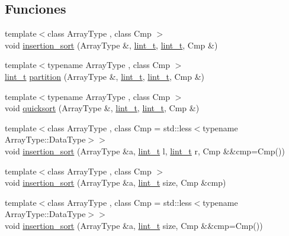 \subsection*{Funciones}
\begin{DoxyCompactItemize}
\item 
{\footnotesize template$<$class Array\+Type , class Cmp $>$ }\\void \hyperlink{namespace_designar_a9fec85a7dda46bb4840bf066c8483853}{insertion\+\_\+sort} (Array\+Type \&, \hyperlink{namespace_designar_a9d113d66a39e82b73727c72cd3a52f73}{lint\+\_\+t}, \hyperlink{namespace_designar_a9d113d66a39e82b73727c72cd3a52f73}{lint\+\_\+t}, Cmp \&)
\item 
{\footnotesize template$<$typename Array\+Type , class Cmp $>$ }\\\hyperlink{namespace_designar_a9d113d66a39e82b73727c72cd3a52f73}{lint\+\_\+t} \hyperlink{namespace_designar_a43b31dd9df26bd0c268d2aa653de6cf0}{partition} (Array\+Type \&, \hyperlink{namespace_designar_a9d113d66a39e82b73727c72cd3a52f73}{lint\+\_\+t}, \hyperlink{namespace_designar_a9d113d66a39e82b73727c72cd3a52f73}{lint\+\_\+t}, Cmp \&)
\item 
{\footnotesize template$<$typename Array\+Type , class Cmp $>$ }\\void \hyperlink{namespace_designar_a2e26fd2dcbb26e5ffc96a960dd4caa94}{quicksort} (Array\+Type \&, \hyperlink{namespace_designar_a9d113d66a39e82b73727c72cd3a52f73}{lint\+\_\+t}, \hyperlink{namespace_designar_a9d113d66a39e82b73727c72cd3a52f73}{lint\+\_\+t}, Cmp \&)
\item 
{\footnotesize template$<$class Array\+Type , class Cmp  = std\+::less$<$typename Array\+Type\+::\+Data\+Type$>$$>$ }\\void \hyperlink{namespace_designar_ab2f897d6db2113316fee5efcd50a459d}{insertion\+\_\+sort} (Array\+Type \&a, \hyperlink{namespace_designar_a9d113d66a39e82b73727c72cd3a52f73}{lint\+\_\+t} l, \hyperlink{namespace_designar_a9d113d66a39e82b73727c72cd3a52f73}{lint\+\_\+t} r, Cmp \&\&cmp=Cmp())
\item 
{\footnotesize template$<$class Array\+Type , class Cmp $>$ }\\void \hyperlink{namespace_designar_a54b704ec22eb8fe7136b1bda64daf3a7}{insertion\+\_\+sort} (Array\+Type \&a, \hyperlink{namespace_designar_a9d113d66a39e82b73727c72cd3a52f73}{lint\+\_\+t} size, Cmp \&cmp)
\item 
{\footnotesize template$<$class Array\+Type , class Cmp  = std\+::less$<$typename Array\+Type\+::\+Data\+Type$>$$>$ }\\void \hyperlink{namespace_designar_a8655d6fa8772dee92565bf7475e5612d}{insertion\+\_\+sort} (Array\+Type \&a, \hyperlink{namespace_designar_a9d113d66a39e82b73727c72cd3a52f73}{lint\+\_\+t} size, Cmp \&\&cmp=Cmp())

\end{DoxyCompactItemize}
